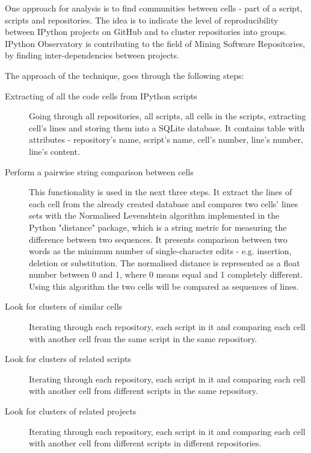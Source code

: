 One approach for analysis is to find communities between cells - part of a script, scripts and repositories. The idea is to indicate the level of reproducibility between IPython projects on GitHub and to cluster repositories into groups. IPython Observatory is contributing to the field of Mining Software Repositories, by finding inter-dependencies between projects. 

The approach of the technique, goes through the following steps: 

\begin{description}
\item [Extracting of all the code cells from IPython scripts] 

Going through all repositories, all scripts, all cells in the scripts, extracting cell's lines and storing them into a SQLite database\cite{sqlite3}. It contains table with attributes - repository's name, script's name, cell's number, line's number, line's content.

\item[Perform a pairwise string comparison between cells] 

This functionality is used in the next three steps. It extract the lines of each cell from the already created database and compares two cells' lines sets with the Normalised Levenshtein algorithm implemented in the Python "distance" package\cite{distance}, which is a string metric for measuring the difference between two sequences. It presents comparison between two words as the minimum number of single-character edits - e.g. insertion, deletion or substitution\cite{levenstein}. The normalised distance is represented as a float number between 0 and 1, where 0 means equal and 1 completely different. Using this algorithm the two cells will be compared as sequences of lines.

\item [Look for clusters of similar cells]

Iterating through each repository, each script in it and comparing each cell with another cell from the same script in the same repository. 

\item [Look for clusters of related scripts]

Iterating through each repository, each script in it and comparing each cell with another cell from different scripts in the same repository.

\item [Look for clusters of related projects] 

Iterating through each repository, each script in it and comparing each cell with another cell from different scripts in different repositories. 

\end{description}

